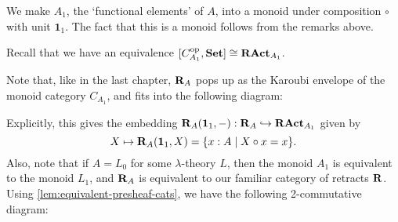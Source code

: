 \begin{definition}
  We make $ A_1 $, the `functional elements' of $ A $, into a monoid under composition $ \circ $ with unit $ \mathbf 1_1 $. The fact that this is a monoid follows from the remarks above.
\end{definition}

Recall that we have an equivalence $ [C_{A_1}^{\text{op}}, \mathbf{Set}] \cong \mathbf{RAct}_{A_1} $.

\begin{remark}\label{rem:ract-presheaf-equivalence}
  Note that, like in the last chapter, $ \mathbf{R}_A $ pops up as the Karoubi envelope of the monoid category $ C_{A_1} $, and fits into the following diagram:
  \begin{center}
  \end{center}
  Explicitly, this gives the embedding $ \mathbf{R}_A(\mathbf 1_1, -): \mathbf{R}_A \hookrightarrow \mathbf{RAct}_{A_1} $ given by
  \[ X \mapsto \mathbf{R}_A(\mathbf 1_1, X) = \{ x : A \mid X \circ x = x \}. \]
  Also, note that if $ A = L_0 $ for some $ \lambda $-theory $ L $, then the monoid $ A_1 $ is equivalent to the monoid $ L_1 $, and $ \mathbf{R}_A $ is equivalent to our familiar category of retracts $ \mathbf{R} $. Using \ref{lem:equivalent-presheaf-cats}, we have the following 2-commutative diagram:
  \begin{center}
  \end{center}
\end{remark}

